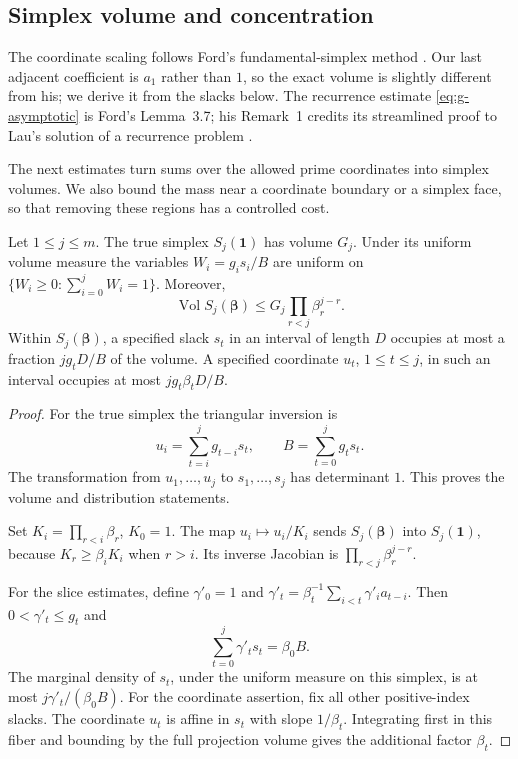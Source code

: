 \subsection{Simplex volume and concentration}
The coordinate scaling follows Ford's fundamental-simplex method
\cite[Lemma~3.2 and Corollary~3.3]{FordTotients2013}.
Our last adjacent coefficient is $a_1$ rather than $1$, so the exact
volume is slightly different from his; we derive it from the slacks
below. The recurrence estimate \eqref{eq:g-asymptotic} is Ford's
Lemma~3.7; his Remark~1 credits its streamlined proof to Lau's solution
of a recurrence problem \cite{FordLau2000}.

The next estimates turn sums over the allowed prime coordinates into
simplex volumes. We also bound the mass near a coordinate boundary or
a simplex face, so that removing these regions has a controlled cost.

\begin{lemma}\label{lem:simplex}
Let \(1\le j\le m\).  The true simplex \(S_j(\boldsymbol1)\) has volume \(G_j\).
Under its uniform volume measure the variables \(W_i=g_is_i/B\)
are uniform on \(\{W_i\ge0:\sum_{i=0}^jW_i=1\}\).
Moreover,
\[
 \operatorname{Vol}S_j(\boldsymbol\beta)
 \le G_j\prod_{r<j}\beta_r^{j-r}.
\]
Within \(S_j(\boldsymbol\beta)\), a specified slack \(s_t\) in an
interval of length \(D\) occupies at most a fraction \(jg_tD/B\)
of the volume.  A specified coordinate \(u_t\), \(1\le t\le j\),
in such an interval occupies at most \(jg_t\beta_tD/B\).
\end{lemma}

\begin{proof}
For the true simplex the triangular inversion is
\[
 u_i=\sum_{t=i}^j g_{t-i}s_t,\qquad
 B=\sum_{t=0}^j g_ts_t.
\]
The transformation from \(u_1,\ldots,u_j\) to \(s_1,\ldots,s_j\)
has determinant \(1\).  This proves the volume and distribution
statements.

Set \(K_i=\prod_{r<i}\beta_r\), \(K_0=1\).
The map \(u_i\mapsto u_i/K_i\) sends
\(S_j(\boldsymbol\beta)\) into \(S_j(\boldsymbol1)\), because
\(K_r\ge\beta_iK_i\) when \(r>i\).  Its inverse Jacobian is
\(\prod_{r<j}\beta_r^{j-r}\).

For the slice estimates, define
\(\gamma'_0=1\) and
\(\gamma'_t=\beta_t^{-1}\sum_{i<t}\gamma'_ia_{t-i}\).
Then \(0<\gamma'_t\le g_t\) and
\[
 \sum_{t=0}^j\gamma'_ts_t=\beta_0B.
\]
The marginal density of \(s_t\), under the uniform measure on this
simplex, is at most \(j\gamma'_t/(\beta_0B)\).
For the coordinate assertion, fix all other positive-index slacks.
The coordinate \(u_t\) is affine in \(s_t\) with slope \(1/\beta_t\).
Integrating first in this fiber and bounding by the full projection
volume gives the additional factor \(\beta_t\).
\end{proof}

